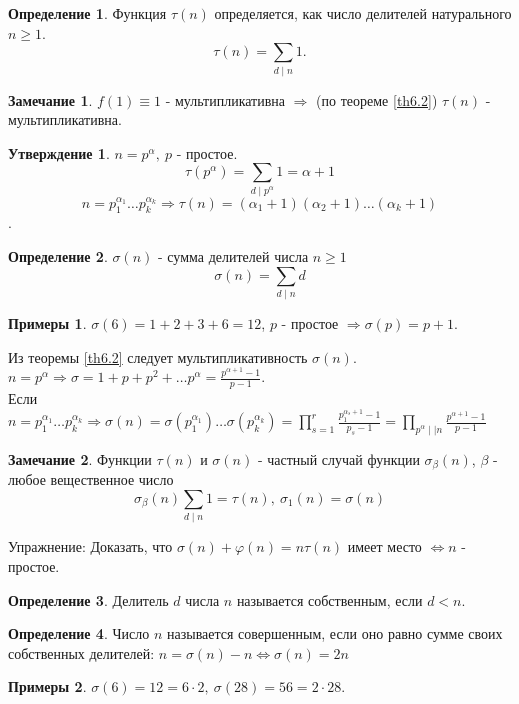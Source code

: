 \documentclass[a4paper, 12pt]{article}
\renewcommand{\phi}{\varphi}
\newcommand{\lra}{\Leftrightarrow}
\renewcommand{\div}{\mid}
\theoremstyle{definition}
\newtheorem{definition}{Определение}[section]
\newtheorem{statement}{Утверждение}[section]
\newtheorem*{comm}{Замечание}
\newtheorem*{examples}{Примеры}
\begin{document}
    \begin{definition}
        Функция $\tau(n)$ определяется, как число делителей натурального $n\geq 1$.
        \[\tau(n)=\sum\limits_{d\div n}1.\]
    \end{definition}
    \begin{comm}
        $f(1)\equiv 1$ - мультипликативна $\Rightarrow$ (по теореме \ref{th6.2}) $\tau(n)$ - мультипликативна.
    \end{comm} 
    \begin{statement}
        $n=p^{\alpha}, \ p$ - простое.
        \[\tau(p^{\alpha})=\sum\limits_{d\div p^{\alpha}}1=\alpha+1\]
        \[n=p_1^{\alpha_1}\dots p_k^{\alpha_k}\Rightarrow \tau(n)=(\alpha_1+1)(\alpha_2+1)\dots(\alpha_k+1)\].
    \end{statement}
    \begin{definition}
        $\sigma(n)$ - сумма делителей числа $n\geq 1$
        \[\sigma(n)=\sum\limits_{d\div n}d\]
    \end{definition} 
    \begin{examples}
        $\sigma(6)=1+2+3+6=12$, $p$ - простое $\Rightarrow \sigma(p)=p+1$.
    \end{examples}
    Из теоремы \ref{th6.2} следует мультипликативность $\sigma(n)$.\\
    $n=p^{\alpha} \Rightarrow \sigma = 1+p+p^2+\dots p^{\alpha}=\frac{p^{\alpha+1}-1}{p-1}$.\\
    Если $n=p_1^{\alpha_1}\dots p_k^{\alpha_k} \Rightarrow \sigma(n)=\sigma(p_1^{\alpha_1})\dots \sigma(p_k^{\alpha_k})=\prod\limits_{s=1}^r\frac{p_1^{\alpha_s+1}-1}{p_s-1}=\prod\limits_{p^{\alpha} \div\div n}\frac{p^{\alpha+1}-1}{p-1}$
    \begin{comm}
        Функции $\tau(n)$ и $\sigma(n)$ - частный случай функции $\sigma_{\beta}(n)$, $\beta$ - любое вещественное число
        \[\sigma_{\beta}(n)\sum\limits_{d\div n}1=\tau(n),\ \sigma_1(n)=\sigma(n)\]
    \end{comm}
    Упражнение: Доказать, что $\sigma(n)+\phi(n)=n\tau(n)$ имеет место $\lra n$ - простое.
    \begin{definition}
        Делитель $d$ числа $n$ называется собственным, если $d<n$.
    \end{definition} 
    \begin{definition}
        Число $n$ называется совершенным, если оно равно сумме своих собственных делителей: $n=\sigma(n)-n\lra \sigma(n)=2n$
    \end{definition}
    \begin{examples}
        $\sigma(6)=12=6\cdot 2,\ \sigma(28)=56=2\cdot 28$.
    \end{examples}
\end{document}
